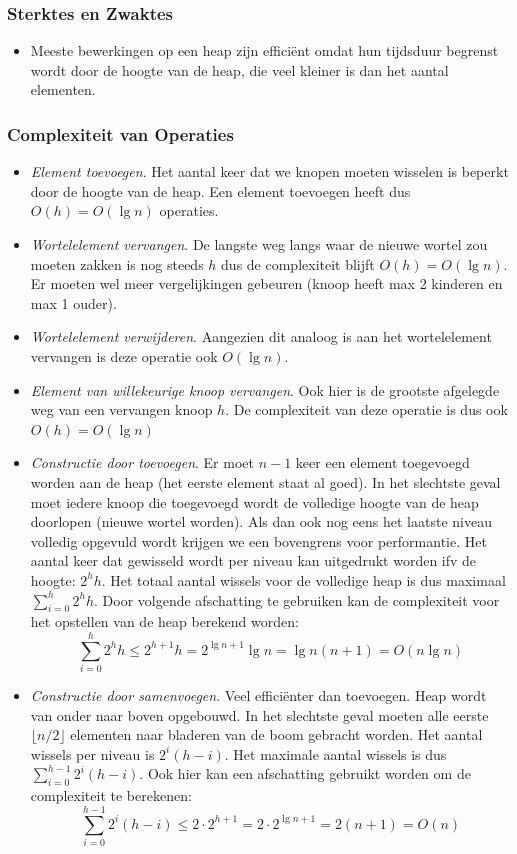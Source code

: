 \documentclass{article}
\begin{document}
\subsubsection{Sterktes en Zwaktes} %
\label{sub:heaps_sterktes_en_zwaktes}
\begin{itemize}
	\item Meeste bewerkingen op een heap zijn efficiënt omdat hun tijdsduur begrenst wordt door de hoogte van de heap, die veel kleiner is dan het aantal elementen.
\end{itemize}


\subsubsection{Complexiteit van Operaties} %
\label{sub:heaps_complexiteit_van_operaties}
\begin{itemize}
	\item \textit{Element toevoegen}. Het aantal keer dat we knopen moeten wisselen is beperkt door de hoogte van de heap. Een element toevoegen heeft dus $O(h) = O(\lg n)$ operaties.
	\item \textit{Wortelelement vervangen}. De langste weg langs waar de nieuwe wortel zou moeten zakken is nog steeds $h$ dus de complexiteit blijft $O(h) = O(\lg n)$. Er moeten wel meer vergelijkingen gebeuren (knoop heeft max 2 kinderen en max 1 ouder).
	\item \textit{Wortelelement verwijderen}. Aangezien dit analoog is aan het wortelelement vervangen is deze operatie ook $O(\lg n)$.
	\item \textit{Element van willekeurige knoop vervangen}. Ook hier is de grootste afgelegde weg van een vervangen knoop $h$. De complexiteit van deze operatie is dus ook $O(h) = O(\lg n)$
	\item \textit{Constructie door toevoegen}. Er moet $n-1$ keer een element toegevoegd worden aan de heap (het eerste element staat al goed). In het slechtste geval moet iedere knoop die toegevoegd wordt de volledige hoogte van de heap doorlopen (nieuwe wortel worden). Als dan ook nog eens het laatste niveau volledig opgevuld wordt krijgen we een bovengrens voor performantie. Het aantal keer dat gewisseld wordt per niveau kan uitgedrukt worden ifv de hoogte: $2^hh$. Het totaal aantal wissels voor de volledige heap is dus maximaal $\sum_{i=0}^{h} 2^hh$. Door volgende afschatting te gebruiken kan de complexiteit voor het opstellen van de heap berekend worden:
	$$\sum_{i=0}^{h} 2^hh \leq 2^{h+1}h = 2^{\lg n + 1}\lg n = \lg n(n+1) = O(n\lg n)$$
	\item \textit{Constructie door samenvoegen}. Veel efficiënter dan toevoegen. Heap wordt van onder naar boven opgebouwd. In het slechtste geval moeten alle eerste $\lfloor n/2 \rfloor$ elementen naar bladeren van de boom gebracht worden. Het aantal wissels per niveau is $2^i(h-i)$. Het maximale aantal wissels is dus $\sum_{i=0}^{h-1} 2^i(h-i)$. Ook hier kan een afschatting gebruikt worden om de complexiteit te berekenen:
	$$\sum_{i=0}^{h-1} 2^i(h-i) \leq 2\cdot 2^{h+1} = 2\cdot 2^{\lg n + 1} = 2(n+1) = O(n)$$
\end{itemize}
\end{document}
